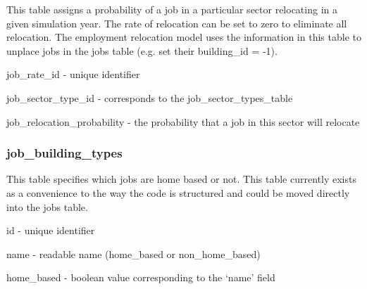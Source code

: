 This table assigns a probability of a job in a particular sector relocating in a given simulation year. The rate of relocation can be set to zero to eliminate all relocation.  The employment relocation model uses the information in this table to unplace jobs in the jobs table (e.g. set their building_id = -1).

\begin{description}
\item job\_rate\_id - unique identifier
\item job\_sector\_type\_id - corresponds to the job\_sector\_types\_table
\item job\_relocation\_probability - the probability that a job in this sector will relocate 
\end{description}

\subsubsection{job\_building\_types} 

This table specifies which jobs are home based or not. This table currently exists as a convenience to the way the code is structured and could be moved directly into the jobs table.

\begin{description}
\item id - unique identifier
\item name - readable name (home\_based or non\_home\_based)
\item home\_based - boolean value corresponding to the `name' field 
\end{description}